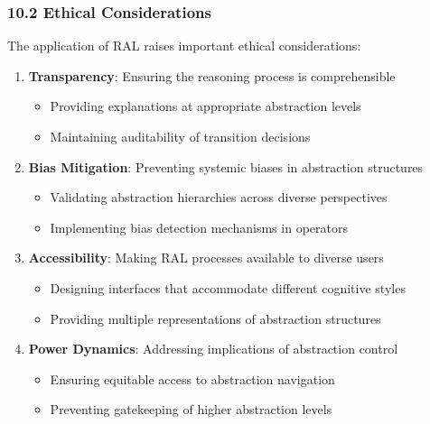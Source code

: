 \documentclass[
]{article}
\providecommand{\tightlist}{%
  \setlength{\itemsep}{0pt}\setlength{\parskip}{0pt}}
\begin{document}
\subsubsection{10.2 Ethical
Considerations}\label{ethical-considerations-2}

The application of RAL raises important ethical considerations:

\begin{enumerate}
\def\labelenumi{\arabic{enumi}.}
\tightlist
\item
  \textbf{Transparency}: Ensuring the reasoning process is
  comprehensible

  \begin{itemize}
  \tightlist
  \item
    Providing explanations at appropriate abstraction levels
  \item
    Maintaining auditability of transition decisions
  \end{itemize}
\item
  \textbf{Bias Mitigation}: Preventing systemic biases in abstraction
  structures

  \begin{itemize}
  \tightlist
  \item
    Validating abstraction hierarchies across diverse perspectives
  \item
    Implementing bias detection mechanisms in operators
  \end{itemize}
\item
  \textbf{Accessibility}: Making RAL processes available to diverse
  users

  \begin{itemize}
  \tightlist
  \item
    Designing interfaces that accommodate different cognitive styles
  \item
    Providing multiple representations of abstraction structures
  \end{itemize}
\item
  \textbf{Power Dynamics}: Addressing implications of abstraction
  control

  \begin{itemize}
  \tightlist
  \item
    Ensuring equitable access to abstraction navigation
  \item
    Preventing gatekeeping of higher abstraction levels
  \end{itemize}
\end{enumerate}
\end{document}

